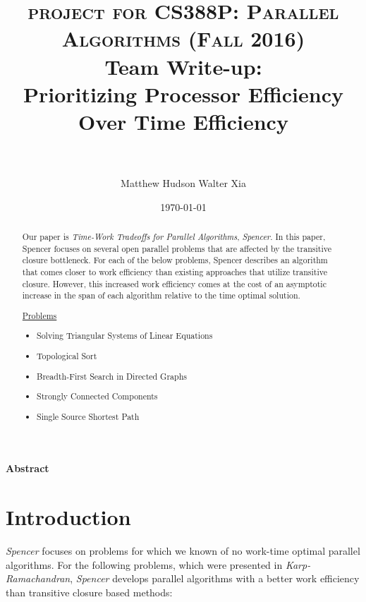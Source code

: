 \documentclass[paper=a4, fontsize=11pt]{scrartcl} %
\title{	
\normalfont \normalsize 
\textsc{project for CS388P: Parallel Algorithms (Fall 2016)} 
\horrule{0.5pt} \\[0.4cm] %
\huge Team Write-up:\\ Prioritizing Processor Efficiency Over Time Efficiency \\ %
\horrule{2pt} \\[0.5cm] %
}
\author{Matthew Hudson \hspace{5mm} Walter Xia }	%
\date{\normalsize\today} %
\numberwithin{equation}{section} %
\numberwithin{figure}{section} %
\numberwithin{table}{section} %
\begin{document}
\maketitle %

\justify
\textbf{Abstract}

\begin{abstract}
Our paper is \textit{Time-Work Tradeoffs for Parallel Algorithms}, \textit{Spencer\cite{S97}}. In this paper, Spencer focuses on several open parallel problems that are affected by the transitive closure bottleneck. For each of the below problems, Spencer describes an algorithm that comes closer to work efficiency than existing approaches that utilize transitive closure. However, this increased work efficiency comes at the cost of an asymptotic increase in the span of each algorithm relative to the time optimal solution.  

\underline{Problems}
\begin{itemize}
\item Solving Triangular Systems of Linear Equations
\item Topological Sort
\item Breadth-First Search in Directed Graphs
\item Strongly Connected Components
\item Single Source Shortest Path
\end{itemize}

\end{abstract}


\section{Introduction}

\textit{Spencer\cite{S97}} focuses on problems for which we known of no work-time optimal parallel algorithms. For the following problems, which were presented in \textit{Karp-Ramachandran\cite{KR90}}, \textit{Spencer\cite{S97}} develops parallel algorithms with a better work efficiency than transitive closure based methods: 
\end{document}
